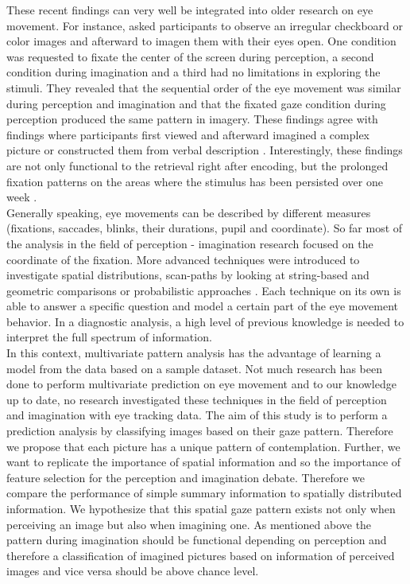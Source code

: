 \documentclass[a4paper,man,natbib,floatsintext]{apa6}
\begin{document}
These recent findings can very well be integrated into older research on eye movement. For instance, \cite{Laeng2002} asked participants to observe an irregular checkboard or color images and afterward to imagen them with their eyes open. One condition was requested to fixate the center of the screen during perception, a second condition during imagination and a third had no limitations in exploring the stimuli. They revealed that the sequential order of the eye movement was similar during perception and imagination and that the fixated gaze condition during perception produced the same pattern in imagery. These findings agree with findings where participants first viewed and afterward imagined a complex picture or constructed them from verbal description \citep{Johansson2006}. Interestingly, these findings are not only functional to the retrieval right after encoding, but the prolonged fixation patterns on the areas where the stimulus has been persisted over one week \citep{Martarelli2013}. \\
Generally speaking, eye movements can be described by different measures (fixations, saccades, blinks, their durations, pupil and coordinate). So far most of the analysis in the field of perception - imagination research focused on the coordinate of the fixation. More advanced techniques were introduced to investigate spatial distributions, scan-paths by looking at string-based and geometric comparisons or probabilistic approaches \citep{Coutrot2018a}. Each technique on its own is able to answer a specific question and model a certain part of the eye movement behavior. In a diagnostic analysis, a high level of previous knowledge is needed to interpret the full spectrum of information. \\
In this context, multivariate pattern analysis has the advantage of learning a model from the data based on a sample dataset. Not much research has been done to perform multivariate prediction on eye movement and to our knowledge up to date, no research investigated these techniques in the field of perception and imagination with eye tracking data. 
The aim of this study is to perform a prediction analysis by classifying images based on their gaze pattern. Therefore we propose that each picture has a unique pattern of contemplation. Further, we want to replicate the importance of spatial information and so the importance of feature selection for the perception and imagination debate. Therefore we compare the performance of simple summary information to spatially distributed information. We hypothesize that this spatial gaze pattern exists not only when perceiving an image but also when imagining one. As mentioned above the pattern during imagination should be functional depending on perception and therefore a classification of imagined pictures based on information of perceived images and vice versa should be above chance level.
\end{document}
